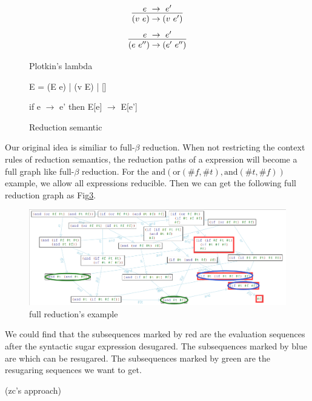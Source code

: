 \begin{figure}[ht]
	\centering
	\[\infer {(v~e) \rightarrow (v~e')}{e~\rightarrow~e'}  \]
	\[\infer {(e~e'') \rightarrow (e'~e'')} {e~\rightarrow~e'}  \]
	\caption{Plotkin's lambda}
	\label{fig:plotkin}
\end{figure} 

\begin{figure}[ht]
	\centering 
	E = (E e) | (v E) | []
	
	if e $\rightarrow$ e' then E[e] $\rightarrow$ E[e']
	\caption{Reduction semantic}
	\label{fig:felleisen}
\end{figure} 

Our original idea is similiar to full-$\beta$ reduction. When not restricting the context rules of reduction semantics, the reduction paths of a expression will become a full graph like full-$\beta$ reduction. For the $\mbox{and}(\mbox{or}(\#f, \#t), \mbox{and}(\#t, \#f))$ example, we allow all expressions reducible. Then we can get the following full reduction graph as Fig\ref{fig:fullreduction}.

\begin{figure}[ht]
	\centering
	\includegraphics[width=12cm]{images/fullreduction.png}
	\caption{full reduction's example}
	\label{fig:fullreduction}
\end{figure}

We could find that the subsequences marked by red are the evaluation sequences after the syntactic sugar expression desugared. The subsequences marked by blue are which can be resugared. The subsequences marked by green are the resugaring sequences we want to get.

(zc's approach)